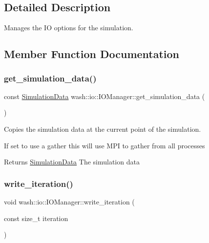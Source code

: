 \subsection{Detailed Description}
Manages the IO options for the simulation. 

\subsection{Member Function Documentation}
\mbox{\label{classwash_1_1io_1_1IOManager_acd4d5358ca4bb964926dfc080a72475c}} 
\subsubsection{\texorpdfstring{get\+\_\+simulation\+\_\+data()}{get\_simulation\_data()}}
{\footnotesize\ttfamily const \mbox{\hyperlink{structwash_1_1io_1_1SimulationData}{Simulation\+Data}} wash\+::io\+::\+I\+O\+Manager\+::get\+\_\+simulation\+\_\+data (\begin{DoxyParamCaption}{ }\end{DoxyParamCaption})\hspace{0.3cm}{\ttfamily [inline]}}



Copies the simulation data at the current point of the simulation. 

If set to use a gather this will use M\+PI to gather from all processes

\begin{DoxyReturn}{Returns}
\mbox{\hyperlink{structwash_1_1io_1_1SimulationData}{Simulation\+Data}} The simulation data 
\end{DoxyReturn}
\mbox{\label{classwash_1_1io_1_1IOManager_ab4670696bfb277a364f6112fc6f0d051}} 
\subsubsection{\texorpdfstring{write\+\_\+iteration()}{write\_iteration()}}
{\footnotesize\ttfamily void wash\+::io\+::\+I\+O\+Manager\+::write\+\_\+iteration (\begin{DoxyParamCaption}\item[{const size\+\_\+t}]{iteration }\end{DoxyParamCaption})\hspace{0.3cm}{\ttfamily [inline]}}



